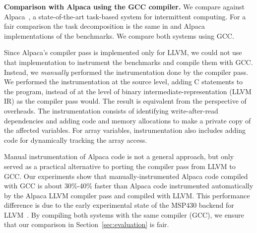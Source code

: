 
\textbf{Comparison with Alpaca using the GCC compiler.} We compare
\sys against Alpaca~\cite{alpaca}, a state-of-the-art task-based system for
intermittent computing. For a fair comparison the task decomposition is the
same in \sys and Alpaca implementations of the benchmarks. We compare
both systems using GCC.

Since Alpaca's compiler pass is implemented only for LLVM, we could not use
that implementation to instrument the benchmarks and compile them with GCC.
Instead, we \emph{manually} performed the instrumentation done by the compiler
pass.  We performed the instrumentation at the source level, adding C
statements to the program, instead of at the level of binary
intermediate-representation (LLVM IR) as the compiler pass would. The result is
equivalent from the perspective of overheads. The instrumentation consists of
identifying write-after-read dependencies and adding code and memory
allocations to make a private copy of the affected variables. For array
variables, instrumentation also includes adding code for 
dynamically tracking the array access.

Manual instrumentation of Alpaca code is not a general approach, but only
served as a practical alternative to porting the compiler pass from LLVM to
GCC.
%
Our experiments show that manually-instrumented Alpaca code compiled with GCC
is about 30\%-40\% faster than Alpaca code instrumented automatically by the
Alpaca LLVM compiler pass and compiled with LLVM. This performance difference
is due to the early experimental state of the MSP430 backend for
LLVM~\cite{baghsorkhi_cgo_2018}.
%
By compiling both systems with the same compiler (GCC), we ensure that our
comparison in Section~\ref{sec:evaluation} is fair.

